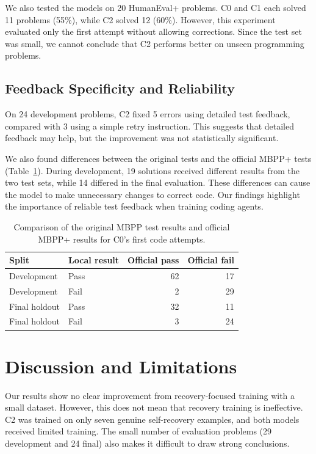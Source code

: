 \documentclass[10pt,twocolumn]{article}
\newcommand{\mbppplus}{MBPP+}
\begin{document}
We also tested the models on 20 HumanEval+ problems. C0 and C1 each solved 11 problems (55\%), while C2 solved 12 (60\%). However, this experiment evaluated only the first attempt without allowing corrections. Since the test set was small, we cannot conclude that C2 performs better on unseen programming problems.


\subsection{Feedback Specificity and Reliability}

On 24 development problems, C2 fixed 5 errors using detailed test feedback, compared with 3 using a simple retry instruction. This suggests that detailed feedback may help, but the improvement was not statistically significant.

We also found differences between the original tests and the official \mbppplus{} tests (Table~\ref{tab:mismatch}). During development, 19 solutions received different results from the two test sets, while 14 differed in the final evaluation. These differences can cause the model to make unnecessary changes to correct code. Our findings highlight the importance of reliable test feedback when training coding agents.


\begin{table}[t]
\centering\small
\caption{Comparison of the original MBPP test results and official MBPP+ results for C0's first code attempts.}
\label{tab:mismatch}
\begin{tabular}{@{}llrr@{}}\toprule
Split & Local result & Official pass & Official fail\\\midrule
Development & Pass & 62 & 17\\
Development & Fail & 2 & 29\\
Final holdout & Pass & 32 & 11\\
Final holdout & Fail & 3 & 24\\\bottomrule
\end{tabular}
\end{table}



\section{Discussion and Limitations}

Our results show no clear improvement from recovery-focused training with a small dataset. However, this does not mean that recovery training is ineffective. C2 was trained on only seven genuine self-recovery examples, and both models received limited training. The small number of evaluation problems (29 development and 24 final) also makes it difficult to draw strong conclusions.
\end{document}
